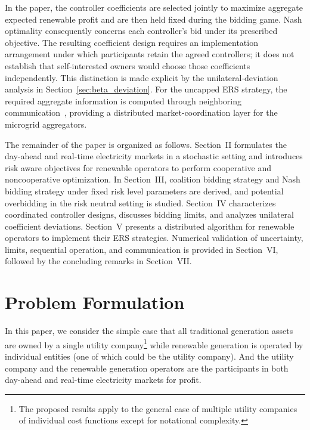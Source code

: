 \documentclass[journal]{IEEEtran}
\begin{document}
In the paper, the controller coefficients are selected jointly to maximize aggregate expected renewable profit and are then held fixed during the bidding game. Nash optimality consequently concerns each controller's bid under its prescribed objective. The resulting coefficient design requires an implementation arrangement under which participants retain the agreed controllers; it does not establish that self-interested owners would choose those coefficients independently. This distinction is made explicit by the unilateral-deviation analysis in Section~\ref{sec:beta_deviation}. For the uncapped ERS strategy, the required aggregate information is computed through neighboring communication~\cite{qu,molzahn2017survey,yang2019survey}, providing a distributed market-coordination layer for the microgrid aggregators.


The remainder of the paper is organized as follows. Section~II formulates the day-ahead and real-time electricity markets in a stochastic setting and introduces risk aware objectives for renewable operators to perform cooperative and noncooperative optimization. In Section~III, coalition bidding strategy and Nash bidding strategy under fixed risk level parameters are derived, and potential overbidding in the risk neutral setting is studied. Section~IV characterizes coordinated controller designs, discusses bidding limits, and analyzes unilateral coefficient deviations. Section~V presents a distributed algorithm for renewable operators to implement their ERS strategies. Numerical validation of uncertainty, limits, sequential operation, and communication is provided in Section~VI, followed by the concluding remarks in Section~VII.

\section{Problem Formulation}

In this paper, we consider the simple case that all traditional generation assets are owned by a single utility company\footnote{The proposed results apply to the general case of multiple utility companies of individual cost functions except for notational complexity.} while renewable generation is operated by individual entities (one of which could be the utility company). And the utility company and the renewable generation operators are the participants in both day-ahead and real-time electricity markets for profit. 
\end{document}
